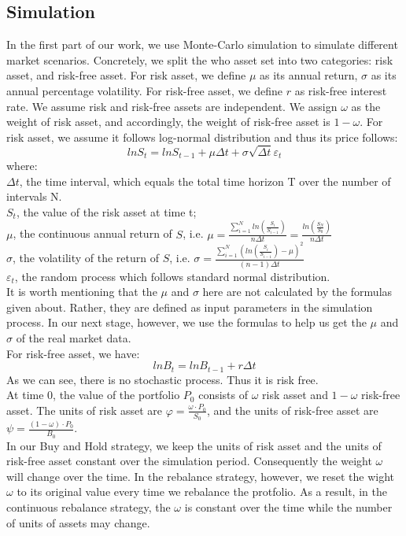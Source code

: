 \documentclass[
10pt, %
a4paper, %
oneside, %
headinclude,footinclude, %
BCOR5mm, %
]{scrartcl}
\begin{document}
\subsection{Simulation}
In the first part of our work, we use Monte-Carlo simulation to simulate different market scenarios. Concretely, we split the who asset set into two categories: risk asset, and risk-free asset. For risk asset, we define $\mu$ as its annual return, $\sigma$ as its annual percentage volatility. For risk-free asset, we define $r$ as risk-free interest rate. We assume risk and risk-free assets are independent. We assign $\omega$ as the weight of risk asset, and accordingly, the weight of risk-free asset is $1-\omega$.
For risk asset, we assume it follows log-normal distribution and thus its price follows:
$$lnS_{t} = lnS_{t-1} + \mu\Delta t + \sigma\sqrt{\Delta t}\varepsilon_{t} $$
where:\\
$\Delta t$, the time interval, which equals the total time horizon T over the number of intervals N.\\
$S_t$, the value of the risk asset at time t; \\
$\mu$, the continuous annual return of $S$, i.e. $\mu = \frac{\sum_{i=1}^{N}ln(\frac{S_i}{S_{i-1}})}{n\Delta t} = \frac{ ln(\frac{S_N}{S_0}) }{n\Delta t}$ \\
$\sigma$, the volatility of the return of $S$, i.e. $\sigma = \frac{ \sum_{i=1}^{N} ( ln(\frac{S_i}{S_{i-1}}) - \mu  )^2   }{(n-1)\Delta t}$ \\
$\varepsilon_t$, the random process which follows standard normal distribution. \\
It is worth mentioning that the $\mu$ and $\sigma$ here are not calculated by the formulas given about. Rather, they are defined as input parameters in the simulation process. In our next stage, however, we use the formulas to help us get the $\mu$ and $\sigma$ of the real market data. \\
For risk-free asset, we have:
$$ lnB_t = lnB_{t-1} + r\Delta t $$
As we can see, there is no stochastic process. Thus it is risk free. \\
At time 0, the value of the portfolio $P_0$ consists of $\omega$ risk asset and $1-\omega$ risk-free asset. The units of risk asset are $\varphi = \frac{\omega\cdot P_0}{S_0} $, and the units of risk-free asset are $\psi =  \frac{(1-\omega)\cdot P_0}{B_0}$. \\
In our Buy and Hold strategy, we keep the units of risk asset and the units of risk-free asset constant over the simulation period. Consequently the weight $\omega$ will change over the time. In the rebalance strategy, however, we reset the wight $\omega$ to its original value every time we rebalance the protfolio. As a result, in the continuous rebalance strategy, the $\omega$ is constant over the time while the number of units of assets may change.\\
\end{document}
